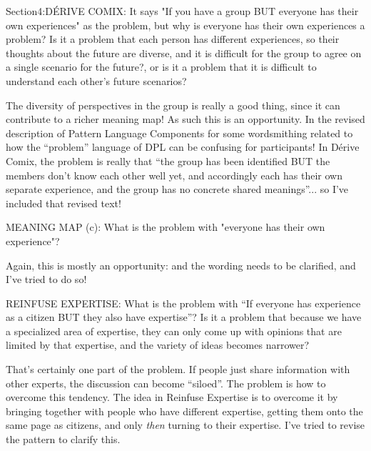\documentclass[acmlarge,timestamp]{acmart}
\begin{document}
\begin{leftbubbles}
Section4:DÉRIVE COMIX: It says "If you have a group BUT everyone has their own experiences" as the problem, but why is everyone has their own experiences a problem?  Is it a problem that each person has different experiences, so their thoughts about the future are diverse, and it is difficult for the group to agree on a single scenario for the future?, or is it a problem that it is difficult to understand each other's future scenarios?
\end{leftbubbles}

\begin{rightbubbles}
The diversity of perspectives in the group is really a good thing, since it can contribute to a richer meaning map!  As such this is an opportunity.  In the revised description of {\sc Pattern Language Components} for some wordsmithing related to how the “problem” language of DPL can be confusing for participants!  In {\sc D\'erive Comix}, the problem is really that “the group has been identified BUT the members don’t know each other well yet, and accordingly each has their own separate experience, and the group has no concrete shared meanings”... so I’ve included that revised text! {\large {}}
\end{rightbubbles}


\begin{leftbubbles}
MEANING MAP (c): What is the problem with "everyone has their own experience"?
\end{leftbubbles}

\begin{rightbubbles}
Again, this is mostly an opportunity: and the wording needs to be
clarified, and I’ve tried to do so! {\large {}}
\end{rightbubbles}

\begin{leftbubbles}
REINFUSE EXPERTISE: What is the problem with “If everyone has experience as a citizen BUT they also have expertise”?  Is it a problem that because we have a specialized area of expertise, they can only come up with opinions that are limited by that expertise, and the variety of ideas becomes narrower?
\end{leftbubbles}

\begin{rightbubbles}
That’s certainly one part of the problem.  If people just share
information with other experts, the discussion can become “siloed”.
The problem is how to overcome this tendency.  The idea in {\sc
  Reinfuse Expertise} is to overcome it by bringing together with
people who have different expertise, getting them onto the same page
as citizens, and only \emph{then} turning to their expertise.  I’ve
tried to revise the pattern to clarify this. {\large {}}
\end{rightbubbles}
\end{document}
